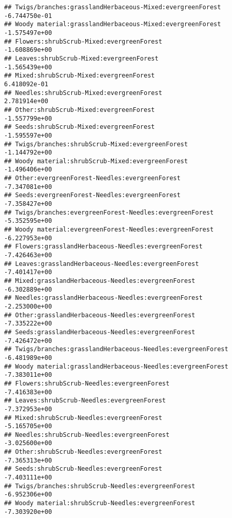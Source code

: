 \documentclass[
]{article}
\begin{document}
\begin{verbatim}
## Twigs/branches:grasslandHerbaceous-Mixed:evergreenForest              -6.744750e-01
## Woody material:grasslandHerbaceous-Mixed:evergreenForest              -1.575497e+00
## Flowers:shrubScrub-Mixed:evergreenForest                              -1.608869e+00
## Leaves:shrubScrub-Mixed:evergreenForest                               -1.565439e+00
## Mixed:shrubScrub-Mixed:evergreenForest                                 6.418092e-01
## Needles:shrubScrub-Mixed:evergreenForest                               2.781914e+00
## Other:shrubScrub-Mixed:evergreenForest                                -1.557799e+00
## Seeds:shrubScrub-Mixed:evergreenForest                                -1.595597e+00
## Twigs/branches:shrubScrub-Mixed:evergreenForest                       -1.144792e+00
## Woody material:shrubScrub-Mixed:evergreenForest                       -1.496406e+00
## Other:evergreenForest-Needles:evergreenForest                         -7.347081e+00
## Seeds:evergreenForest-Needles:evergreenForest                         -7.358427e+00
## Twigs/branches:evergreenForest-Needles:evergreenForest                -5.352595e+00
## Woody material:evergreenForest-Needles:evergreenForest                -6.227953e+00
## Flowers:grasslandHerbaceous-Needles:evergreenForest                   -7.426463e+00
## Leaves:grasslandHerbaceous-Needles:evergreenForest                    -7.401417e+00
## Mixed:grasslandHerbaceous-Needles:evergreenForest                     -6.302889e+00
## Needles:grasslandHerbaceous-Needles:evergreenForest                   -2.253000e+00
## Other:grasslandHerbaceous-Needles:evergreenForest                     -7.335222e+00
## Seeds:grasslandHerbaceous-Needles:evergreenForest                     -7.426472e+00
## Twigs/branches:grasslandHerbaceous-Needles:evergreenForest            -6.481989e+00
## Woody material:grasslandHerbaceous-Needles:evergreenForest            -7.383011e+00
## Flowers:shrubScrub-Needles:evergreenForest                            -7.416383e+00
## Leaves:shrubScrub-Needles:evergreenForest                             -7.372953e+00
## Mixed:shrubScrub-Needles:evergreenForest                              -5.165705e+00
## Needles:shrubScrub-Needles:evergreenForest                            -3.025600e+00
## Other:shrubScrub-Needles:evergreenForest                              -7.365313e+00
## Seeds:shrubScrub-Needles:evergreenForest                              -7.403111e+00
## Twigs/branches:shrubScrub-Needles:evergreenForest                     -6.952306e+00
## Woody material:shrubScrub-Needles:evergreenForest                     -7.303920e+00

\end{verbatim}
\end{document}
